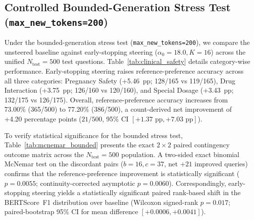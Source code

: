 \subsection{Controlled Bounded-Generation Stress Test (\texttt{max\_new\_tokens=200})}
Under the bounded-generation stress test (\texttt{max\_new\_tokens=200}), we compare the unsteered baseline against early-stopping steering ($\alpha_0=18.0, K=16$) across the unified $N_{\text{test}}=500$ test questions. Table~\ref{tab:clinical_safety} details category-wise performance. Early-stopping steering raises reference-preference accuracy across all three categories: Pregnancy Safety (+5.46~pp; 128/165 vs 119/165), Drug Interaction (+3.75~pp; 126/160 vs 120/160), and Special Dosage (+3.43~pp; 132/175 vs 126/175). Overall, reference-preference accuracy increases from 73.00\% (365/500) to 77.20\% (386/500), a count-derived net improvement of +4.20 percentage points ($21/500$, 95\% CI $[+1.37\text{ pp}, +7.03\text{ pp}]$).

\begin{table}[htbp]
\caption{BERTScore Reference-Preference Evaluation ($N_{\text{test}}=500$, \texttt{max\_new\_tokens=200})}
\label{tab:clinical_safety}
\centering
{}
\end{table}

To verify statistical significance for the bounded stress test, Table~\ref{tab:mcnemar_bounded} presents the exact $2\times 2$ paired contingency outcome matrix across the $N_{\text{test}}=500$ population. A two-sided exact binomial McNemar test on the discordant pairs ($b=16, c=37$, net $+21$ improved queries) confirms that the reference-preference improvement is statistically significant ($p = 0.0055$; continuity-corrected asymptotic $p = 0.0060$). Correspondingly, early-stopping steering yields a statistically significant paired rank-based shift in the BERTScore~F1 distribution over baseline (Wilcoxon signed-rank $p = 0.017$; paired-bootstrap 95\% CI for mean difference $[+0.0006, +0.0041]$).

